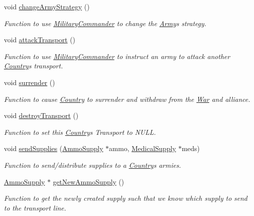 \begin{DoxyCompactItemize}
void \mbox{\hyperlink{class_country_adfb891f4f46c41276395d09cc9bc2a6a}{change\+Army\+Strategy}} ()
\begin{DoxyCompactList}\small\item\em Function to use \mbox{\hyperlink{class_military_commander}{Military\+Commander}} to change the \mbox{\hyperlink{class_army}{Army}}\textquotesingle{}s strategy. \end{DoxyCompactList}\item 
void \mbox{\hyperlink{class_country_a1097aaf13d5a15eb30ea0ccc4b7fa211}{attack\+Transport}} ()
\begin{DoxyCompactList}\small\item\em Function to use \mbox{\hyperlink{class_military_commander}{Military\+Commander}} to instruct an army to attack another \mbox{\hyperlink{class_country}{Country}}\textquotesingle{}s transport. \end{DoxyCompactList}\item 
void \mbox{\hyperlink{class_country_ac3fe57380b664018f560b43b2f549193}{surrender}} ()
\begin{DoxyCompactList}\small\item\em Function to cause \mbox{\hyperlink{class_country}{Country}} to surrender and withdraw from the \mbox{\hyperlink{class_war}{War}} and alliance. \end{DoxyCompactList}\item 
void \mbox{\hyperlink{class_country_af8b0fd589846db503b902d6f6ed19003}{destroy\+Transport}} ()
\begin{DoxyCompactList}\small\item\em Function to set this \mbox{\hyperlink{class_country}{Country}}\textquotesingle{}s Transport to N\+U\+LL. \end{DoxyCompactList}\item 
void \mbox{\hyperlink{class_country_ae14d96ddafd2eb7b9c173fb26908fab7}{send\+Supplies}} (\mbox{\hyperlink{class_ammo_supply}{Ammo\+Supply}} $\ast$ammo, \mbox{\hyperlink{class_medical_supply}{Medical\+Supply}} $\ast$meds)
\begin{DoxyCompactList}\small\item\em Function to send/distribute supplies to a \mbox{\hyperlink{class_country}{Country}}\textquotesingle{}s armies. \end{DoxyCompactList}\item 
\mbox{\hyperlink{class_ammo_supply}{Ammo\+Supply}} $\ast$ \mbox{\hyperlink{class_country_a959665cddc5e2cbadaae9736f376cf23}{get\+New\+Ammo\+Supply}} ()
\begin{DoxyCompactList}\small\item\em Function to get the newly created supply such that we know which supply to send to the transport line. \end{DoxyCompactList}\item 

\end{DoxyCompactItemize}
